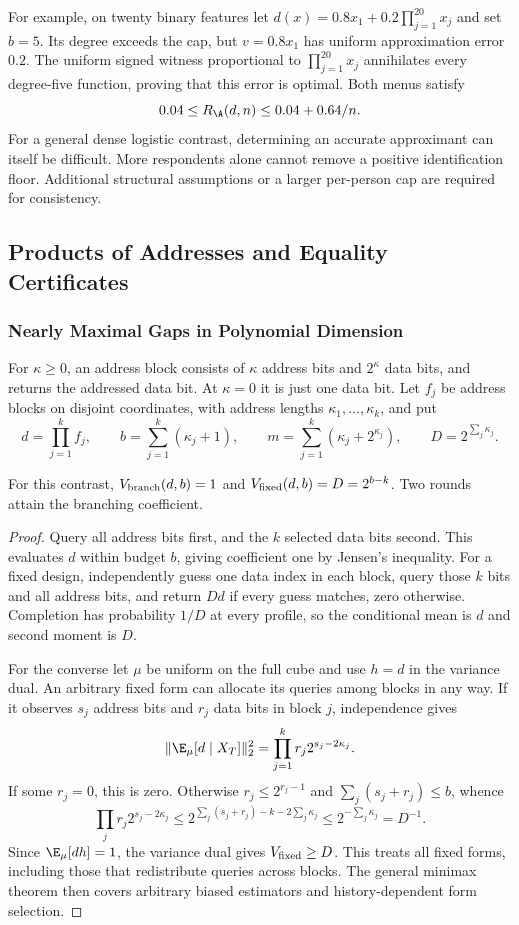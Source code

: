 For example, on twenty binary features let $d(x)=0.8x_1+0.2\prod_{j=1}^{20}x_j$ and set $b=5$. Its degree exceeds the cap, but $v=0.8x_1$ has uniform approximation error $0.2$. The uniform signed witness proportional to $\prod_{j=1}^{20}x_j$ annihilates every degree-five function, proving that this error is optimal. Both menus satisfy
\[
 0.04\le R_\A(d,n)\le0.04+0.64/n.
\]
For a general dense logistic contrast, determining an accurate approximant can itself be difficult. More respondents alone cannot remove a positive identification floor. Additional structural assumptions or a larger per-person cap are required for consistency.

\subsection{Products of Addresses and Equality Certificates}\label{app:structure}
\subsubsection{Nearly Maximal Gaps in Polynomial Dimension}\label{app:productaddress}
For $\kappa\ge0$, an address block consists of $\kappa$ address bits and $2^\kappa$ data bits, and returns the addressed data bit. At $\kappa=0$ it is just one data bit. Let $f_j$ be address blocks on disjoint coordinates, with address lengths $\kappa_1,\ldots,\kappa_k$, and put
\[
 d=\prod_{j=1}^k f_j,\qquad
 b=\sum_{j=1}^k(\kappa_j+1),\qquad
 m=\sum_{j=1}^k(\kappa_j+2^{\kappa_j}),\qquad D=2^{\sum_j \kappa_j}.
\]
\begin{proposition}\label{prop:productaddress}
For this contrast, $V_{\rm branch}(d,b)=1$ and $V_{\rm fixed}(d,b)=D=2^{b-k}$. Two rounds attain the branching coefficient.
\end{proposition}
\begin{proof}
Query all address bits first, and the $k$ selected data bits second. This evaluates $d$ within budget $b$, giving coefficient one by Jensen's inequality. For a fixed design, independently guess one data index in each block, query those $k$ bits and all address bits, and return $D d$ if every guess matches, zero otherwise. Completion has probability $1/D$ at every profile, so the conditional mean is $d$ and second moment is $D$.

For the converse let $\mu$ be uniform on the full cube and use $h=d$ in the variance dual. An arbitrary fixed form can allocate its queries among blocks in any way. If it observes $s_j$ address bits and $r_j$ data bits in block $j$, independence gives
\[
 \|\E_\mu[d\mid X_T]\|_2^2
 =\prod_{j=1}^k r_j2^{s_j-2\kappa_j}.
\]
If some $r_j=0$, this is zero. Otherwise $r_j\le2^{r_j-1}$ and $\sum_j(s_j+r_j)\le b$, whence
\[
 \prod_j r_j2^{s_j-2\kappa_j}
 \le 2^{\sum_j(s_j+r_j)-k-2\sum_j \kappa_j}
 \le 2^{-\sum_j \kappa_j}=D^{-1}.
\]
Since $\E_\mu[dh]=1$, the variance dual gives $V_{\rm fixed}\ge D$. This treats all fixed forms, including those that redistribute queries across blocks. The general minimax theorem then covers arbitrary biased estimators and history-dependent form selection.
\end{proof}

